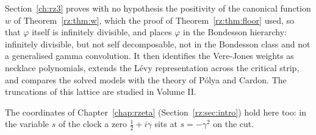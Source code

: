 \label{chap:rzid}

Section~\ref{ch:rz3} proves with no hypothesis the positivity of the canonical function $w$ of Theorem~\ref{rz:thm:w}, which the proof of Theorem~\ref{rz:thm:floor} used, so that $\varphi$ itself is infinitely divisible, and places $\varphi$ in the Bondesson hierarchy: infinitely divisible, but not self decomposable, not in the Bondesson class and not a generalised gamma convolution. It then identifies the Vere-Jones weights as necklace polynomials, extends the L\'evy representation across the critical strip, and compares the solved models with the theory of P\'olya and Cardon. The truncations of this lattice are studied in Volume II.

The coordinates of Chapter~\ref{chap:rzeta} (Section~\ref{rz:sec:intro}) hold here too: in the variable $s$ of the clock a zero $\frac12+i\gamma$ sits at $s=-\gamma^2$ on the cut.
